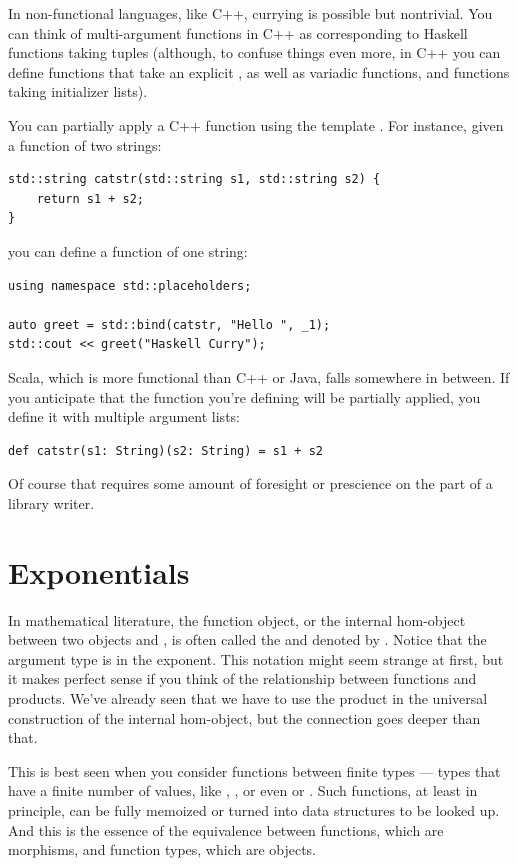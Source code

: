 In non-functional languages, like C++, currying is possible but
nontrivial. You can think of multi-argument functions in C++ as
corresponding to Haskell functions taking tuples (although, to confuse
things even more, in C++ you can define functions that take an explicit
, as well as variadic functions, and functions taking
initializer lists).

You can partially apply a C++ function using the template
. For instance, given a function of two strings:

\begin{verbatim}
std::string catstr(std::string s1, std::string s2) {
    return s1 + s2;
}
\end{verbatim}
you can define a function of one string:

\begin{verbatim}
using namespace std::placeholders;

auto greet = std::bind(catstr, "Hello ", _1);
std::cout << greet("Haskell Curry");
\end{verbatim}
Scala, which is more functional than C++ or Java, falls somewhere in
between. If you anticipate that the function you're defining will be
partially applied, you define it with multiple argument lists:

\begin{verbatim}
def catstr(s1: String)(s2: String) = s1 + s2
\end{verbatim}
Of course that requires some amount of foresight or prescience on the
part of a library writer.

\section{Exponentials}\label{exponentials}

In mathematical literature, the function object, or the internal
hom-object between two objects  and , is often
called the  and denoted by . Notice that
the argument type is in the exponent. This notation might seem strange
at first, but it makes perfect sense if you think of the relationship
between functions and products. We've already seen that we have to use
the product in the universal construction of the internal hom-object,
but the connection goes deeper than that.

This is best seen when you consider functions between finite types ---
types that have a finite number of values, like ,
, or even  or . Such functions,
at least in principle, can be fully memoized or turned into data
structures to be looked up. And this is the essence of the equivalence
between functions, which are morphisms, and function types, which are
objects.

